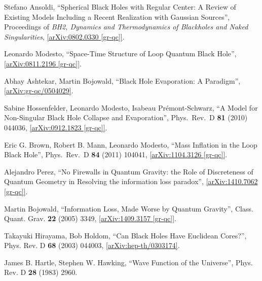 \documentclass[12pt]{article}
\newcommand{\2}{$^2$}
\newcommand{\3}{$^3$}
\newcommand{\4}{$_4$}
\newcommand{\5}{$_5$}
\begin{document}
\begin{thebibliography}{400}
Stefano Ansoldi, 
``Spherical Black Holes with Regular Center: A Review of Existing Models Including a Recent Realization with Gaussian Sources'', Proceedings of \emph{BH2, Dynamics and Thermodynamics of Blackholes and Naked Singularities}, 
\href{http://arxiv.org/abs/0802.0330}{[arXiv:0802.0330 [gr-qc]]}.

 Leonardo Modesto,
  ``Space-Time Structure of Loop Quantum Black Hole'', \href{http://arxiv.org/abs/0811.2196}{[arXiv:0811.2196 [gr-qc]]}.
	
Abhay Ashtekar, Martin Bojowald, ``Black Hole Evaporation: A Paradigm'', \href{http://arxiv.org/abs/gr-qc/0504029v2}{[arXiv:gr-qc/0504029]}.


 Sabine Hossenfelder, Leonardo Modesto, Isabeau Pr\'emont-Schwarz,
  ``A Model for Non-Singular Black Hole Collapse and Evaporation'',
  Phys.\ Rev.\ D {\bf 81} (2010) 044036, \href{http://arxiv.org/abs/0912.1823}{[arXiv:0912.1823 [gr-qc]]}.

Eric G. Brown, Robert B. Mann, Leonardo Modesto,
  ``Mass Inflation in the Loop Black Hole'',
  Phys.\ Rev.\ D {\bf 84} (2011) 104041,
	\href{http://arxiv.org/abs/1104.3126}{[arXiv:1104.3126 [gr-qc]]}.
	
Alejandro Perez, ``No Firewalls in Quantum Gravity: the Role of Discreteness of Quantum Geometry in Resolving the information loss paradox'', \href{http://arxiv.org/abs/1410.7062v1}{[arXiv:1410.7062 [gr-qc]]}.

Martin Bojowald, ``Information Loss, Made Worse by Quantum Gravity'', Class. Quant. Grav. \textbf{22} (2005) 3349, \href{http://arxiv.org/abs/1409.3157}{[arXiv:1409.3157 [gr-qc]]}.

Takayuki Hirayama, Bob Holdom, ``Can Black Holes Have Euclidean Cores?'', Phys. Rev. D \textbf{68} (2003) 044003, \href{http://arxiv.org/abs/hep-th/0303174}{[arXiv:hep-th/0303174]}.


James B. Hartle, Stephen W. Hawking, ``Wave Function of the Universe'', Phys. Rev. D \textbf{28} (1983) 2960.
		

\end{thebibliography}
\end{document}
